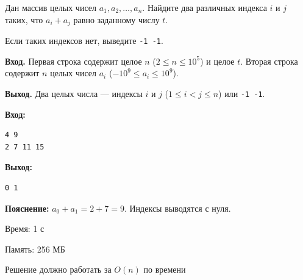 \begin{problem}
Дан массив целых чисел $a_1, a_2, \ldots, a_n$. Найдите два различных индекса $i$ и $j$ таких, что $a_i + a_j$ равно заданному числу $t$.

Если таких индексов нет, выведите \texttt{-1 -1}.
\end{problem}

\begin{io}
\textbf{Вход.} Первая строка содержит целое $n$ ($2 \leq n \leq 10^5$) и целое $t$. Вторая строка содержит $n$ целых чисел $a_i$ ($-10^9 \leq a_i \leq 10^9$).

\textbf{Выход.} Два целых числа --- индексы $i$ и $j$ ($1 \leq i < j \leq n$) или \texttt{-1 -1}.
\end{io}

\begin{example}
\noindent\textbf{Вход:}
\begin{lstlisting}
4 9
2 7 11 15
\end{lstlisting}
\noindent\textbf{Выход:}
\begin{lstlisting}
0 1
\end{lstlisting}

\smallskip
\noindent\textbf{Пояснение:} $a_0 + a_1 = 2 + 7 = 9$. Индексы выводятся с нуля.
\end{example}

\begin{constraints}
  \item Время: 1 с
  \item Память: 256 МБ
  \item Решение должно работать за $O(n)$ по времени
\end{constraints}
